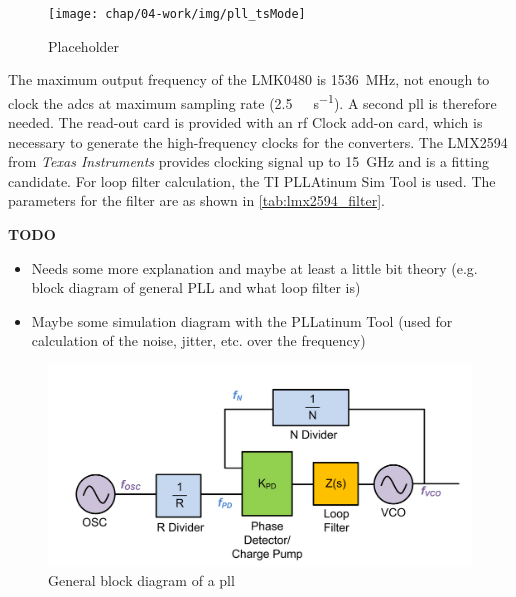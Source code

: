 \begin{figure}[tbh]
	\centering
	\texttt{[image: chap/04-work/img/pll\_tsMode]}
	\caption{Placeholder}
	\label{fig:clocking}
\end{figure}

The maximum output frequency of the LMK0480 is \SI{1536}{\mega \hertz}, not enough to clock the \glspl{adc} at maximum sampling rate (\SI{2.5}{\giga \sample \per \second}). A second \gls{pll} is therefore needed. The read-out card is provided with an \gls{rf} Clock add-on card, which is necessary to generate the high-frequency clocks for the converters. The LMX2594 from \textit{Texas Instruments} provides clocking signal up to \SI{15}{\giga \hertz} and is a fitting candidate. For loop filter calculation, the TI PLLAtinum Sim Tool is used. The parameters for the filter are as shown in \autoref{tab:lmx2594_filter}.

\textbf{TODO} 
\begin{itemize}
	\item Needs some more explanation and maybe at least a little bit theory (e.g. block diagram of general PLL and what loop filter is)
	\item Maybe some simulation diagram with the PLLatinum Tool (used for calculation of the noise, jitter, etc. over the frequency)
\end{itemize}

\begin{figure}[tbh]
	\centering
	\includegraphics[width = \textwidth]{chap/04-work/img/pll_block}
	\caption[PLL block diagram]{General block diagram of a \gls{pll}}
	\label{fig:pll_block}
\end{figure}


